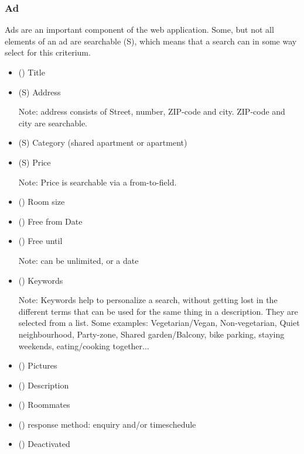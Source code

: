 \documentclass[a4wide]{article}
\begin{document}
\subsubsection{Ad}
Ads are an important component of the web application. 
Some, but not all elements of an ad are searchable (S),
which means that a search can in some way select for this criterium.
\begin{itemize}
\item () Title
\item (S) Address

	Note: address consists of Street, number, ZIP-code and city. ZIP-code and city are searchable.
\item (S) Category (shared apartment or apartment)
\item (S) Price

	Note: Price is searchable via a from-to-field.
\item () Room size

\item () Free from Date

\item () Free until

	Note: can be unlimited, or a date
\item () Keywords

	Note: Keywords help to personalize a search, without getting lost in the different terms 
	that can be used for the same thing in a description.
	They are selected from a list.
	Some examples: Vegetarian/Vegan, Non-vegetarian, Quiet neighbourhood, Party-zone, 
	Shared garden/Balcony, bike parking, staying weekends, eating/cooking together...
\item () Pictures
\item () Description
\item () Roommates

\item () response method: enquiry and/or timeschedule 
\item () Deactivated
\end{itemize}
\end{document}
